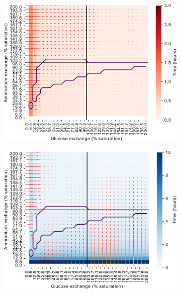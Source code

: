 \begin{figure}
\begin{subfigure}[t]{0.45\textwidth}
    \caption{
    }
    \label{fig:model-grid-glc-growthrate}
  \end{subfigure}

  \begin{subfigure}[t]{0.45\textwidth}
  \centering
    \includegraphics[width=\linewidth]{ec_grid_glc_amm_carb}
    \caption{
    }
    \label{fig:model-grid-glc-carb}
  \end{subfigure}%
  \begin{subfigure}[t]{0.45\textwidth}
  \centering
    \includegraphics[width=\linewidth]{ec_grid_glc_amm_prot}
    \caption{
    }
    \label{fig:model-grid-glc-prot}
  \end{subfigure}


\end{figure}
